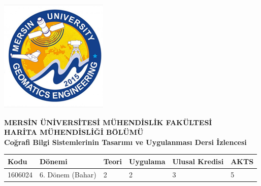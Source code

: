 \documentclass[10pt]{article}
\begin{document}
\begin{minipage}{0.2\textwidth}
\includegraphics[width=\linewidth]{bölüm_logo.png} %
\end{minipage}
\begin{minipage}{0.8\textwidth}
\begin{center}
\textbf{\Large MERSİN ÜNİVERSİTESİ MÜHENDİSLİK FAKÜLTESİ} \\
\vspace{0.5cm}
\textbf{\large HARİTA MÜHENDİSLİĞİ BÖLÜMÜ} \\
\vspace{0.5cm}
\textbf{\large Coğrafi Bilgi Sistemlerinin Tasarımı ve Uygulanması Dersi İzlencesi}
\end{center}
\end{minipage}

\vspace{0.1cm}

\begin{tabularx}{\textwidth}{|l|X|l|l|l|l|}
\hline
\textbf{Kodu} & \textbf{Dönemi} & \textbf{Teori} & \textbf{Uygulama} & \textbf{Ulusal Kredisi} & \textbf{AKTS} \\
\hline
1606024 & 6. Dönem (Bahar) & 2 & 2 & 3 & 5 \\
\hline
\end{tabularx}
\end{document}
